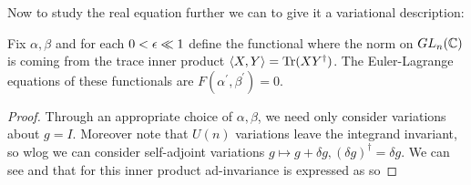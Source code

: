 \documentclass{article}
\begin{document}
Now to study the real equation further we can to give it a variational description:
\begin{prop}
	Fix $\alpha,\beta$ and for each $0<\epsilon \ll 1$ define the functional 
where the norm on $GL_n(\mathbb{C})$ is coming from the trace inner product $\left\langle X,Y \right\rangle = \operatorname{Tr}(XY^\dagger)$. The Euler-Lagrange equations of these functionals are $F(\alpha^\prime, \beta^\prime)=0$. 
\end{prop}
\begin{proof}
Through an appropriate choice of $\alpha,\beta$, we need only consider variations about $g=I$. Moreover note that $U(n)$ variations leave the integrand invariant, so wlog we can consider self-adjoint variations $g \mapsto g+\delta g, (\delta g)^\dagger = \delta g$. We can see 
and that for this inner product ad-invariance is expressed as
so 
\end{proof}
\end{document}
